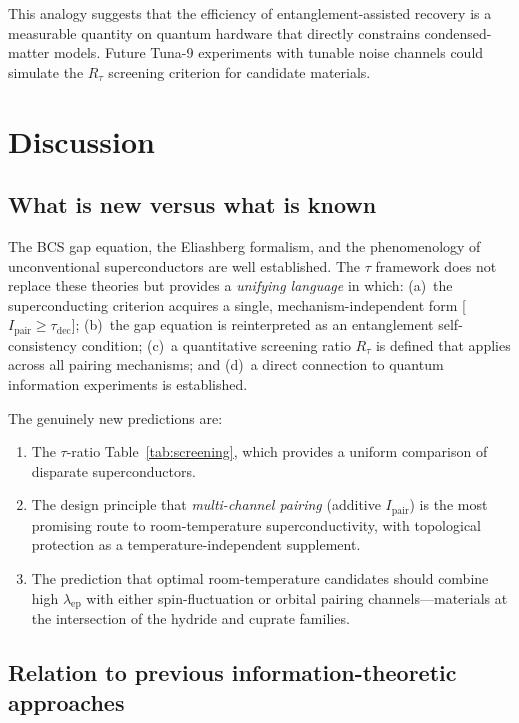 \documentclass[prb,twocolumn,superscriptaddress,longbibliography,floatfix]{revtex4-2}
\newcommand{\tauasym}{\tau}
\newcommand{\taudec}{\tauasym_{\mathrm{dec}}}
\newcommand{\Ipair}{I_{\mathrm{pair}}}
\newcommand{\Rtau}{R_{\tauasym}}
\begin{document}
This analogy suggests that the efficiency of entanglement-assisted
recovery is a measurable quantity on quantum hardware that directly
constrains condensed-matter models.  Future Tuna-9 experiments with
tunable noise channels could simulate the $\Rtau$ screening criterion
for candidate materials.

\section{Discussion}
\label{sec:discussion}

\subsection{What is new versus what is known}

The BCS gap equation, the Eliashberg formalism, and the
phenomenology of unconventional superconductors are well
established.  The $\tauasym$ framework does not replace these
theories but provides a \emph{unifying language} in which:
(a)~the superconducting criterion acquires a single,
mechanism-independent form [$\Ipair \geq \taudec$];
(b)~the gap equation is reinterpreted as an entanglement
self-consistency condition;
(c)~a quantitative screening ratio $\Rtau$ is defined that
applies across all pairing mechanisms; and
(d)~a direct connection to quantum information experiments
is established.

The genuinely new predictions are:
\begin{enumerate}
\item The $\tauasym$-ratio Table~\ref{tab:screening}, which
  provides a uniform comparison of disparate superconductors.
\item The design principle that \emph{multi-channel pairing}
  (additive $\Ipair$) is the most promising route to
  room-temperature superconductivity, with topological protection
  as a temperature-independent supplement.
\item The prediction that optimal room-temperature candidates
  should combine high $\lambda_{\mathrm{ep}}$ with either
  spin-fluctuation or orbital pairing channels---materials
  at the intersection of the hydride and cuprate families.
\end{enumerate}

\subsection{Relation to previous information-theoretic approaches}
\end{document}
